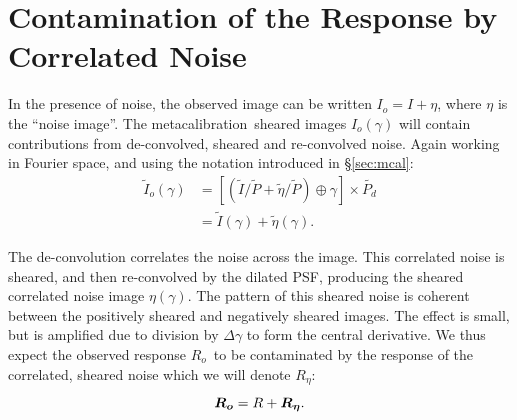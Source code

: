 \documentclass[iop]{emulateapj}
\newcommand{\mcal}{metacalibration}
\newcommand{\mcalRo}{\mbox{\boldmath $R_o$}}
\newcommand{\mcalRnoise}{\mbox{\boldmath $R_\eta$}}
\newcommand{\Itild}{\mbox{$\widetilde{I}$}}
\newcommand{\ntil}{\mbox{$\widetilde{\eta}$}}
\newcommand{\Ptil}{\mbox{$\widetilde{P}$}}
\newcommand{\Ptild}{\mbox{$\widetilde{P_d}$}}
\newcommand{\SSs}{$\left<R_{S}R_{S}\right>$}
\begin{document}

\section{Contamination of the Response by Correlated Noise} \label{sec:contam}

In the presence of noise, the observed image can be written $I_o=I+\eta$, where $\eta$
is the ``noise image''.  The \mcal\ sheared images $I_o(\gamma)$ will contain
contributions from de-convolved, sheared and re-convolved noise. Again working
in Fourier space, and using the notation introduced in \S \ref{sec:mcal}:
\begin{align}
    \Itild_o(\gamma) &= \left[ \left( \Itild/\Ptil + \ntil/\Ptil \right) \oplus \gamma \right] \times \Ptild  \nonumber \\
    &= \Itild(\gamma) + \ntil(\gamma).
\end{align}

The de-convolution correlates the noise across the image.  This correlated
noise is sheared, and then re-convolved by the dilated PSF, producing the
sheared correlated noise image $\eta(\gamma)$.  The pattern of this sheared
noise is coherent between the positively sheared and negatively sheared images.
The effect is small, but is amplified due to division by $\Delta \gamma$ to
form the central derivative.  We thus expect the observed response \mcalRo\ to
be contaminated by the response of the correlated, sheared noise which
we will denote \mcalRnoise:
\begin{equation}
    \mbox{\mcalRo}  =  R + \mbox{\mcalRnoise}.
\end{equation}
\end{document}
